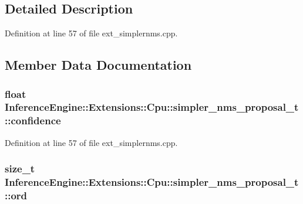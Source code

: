 \subsection{Detailed Description}


Definition at line 57 of file ext\+\_\+simplernms.\+cpp.



\subsection{Member Data Documentation}
\subsubsection[{\texorpdfstring{confidence}{confidence}}]{\setlength{\rightskip}{0pt plus 5cm}float Inference\+Engine\+::\+Extensions\+::\+Cpu\+::simpler\+\_\+nms\+\_\+proposal\+\_\+t\+::confidence}\hypertarget{structInferenceEngine_1_1Extensions_1_1Cpu_1_1simpler__nms__proposal__t_a53f390d72956e4e3ad983827746340e7}{}\label{structInferenceEngine_1_1Extensions_1_1Cpu_1_1simpler__nms__proposal__t_a53f390d72956e4e3ad983827746340e7}


Definition at line 57 of file ext\+\_\+simplernms.\+cpp.

\subsubsection[{\texorpdfstring{ord}{ord}}]{\setlength{\rightskip}{0pt plus 5cm}size\+\_\+t Inference\+Engine\+::\+Extensions\+::\+Cpu\+::simpler\+\_\+nms\+\_\+proposal\+\_\+t\+::ord}\hypertarget{structInferenceEngine_1_1Extensions_1_1Cpu_1_1simpler__nms__proposal__t_ab2805bf682ee59cdb042e85e9b33cbb1}{}\label{structInferenceEngine_1_1Extensions_1_1Cpu_1_1simpler__nms__proposal__t_ab2805bf682ee59cdb042e85e9b33cbb1}


